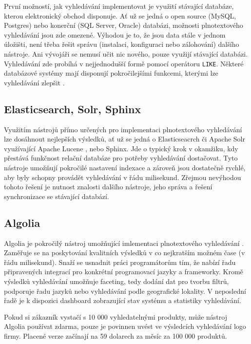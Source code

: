\documentclass[FM,DP]{tulthesis}
\begin{document}
První možností, jak vyhledávání implementovat je využití stávající databáze, 
kterou elektronický obchod disponuje. Ať už se jedná o open source (MySQL, Postgres)
nebo konerční (SQL Server, Oracle) databázi, možnosti plnotextového vyhledávání
jsou zde omezené. Výhodou je to, že jsou data stále v jednom úložišti, není třeba
řešit správu (instalaci, konfiguraci nebo zálohování) dalšího nástroje. Ani vývojáři 
se nemusí učit nic nového, pouze využijí stávající databázi. Vyhledávání zde probíhá
v nejjednodušší formě pomocí operátoru \verb|LIKE|. Některé databázové systémy
mají disponují pokročilejšími funkcemi, kterými lze vyhledávání zlepšit \cite{postgres}.

\subsection{Elasticsearch, Solr, Sphinx}

Využitím nástrojů přímo určených pro implementaci plnotextového vyhledávání lze 
dosáhnout nejlepších výsledků, ať už se jedná o Elasticseacrch či Apache Solr využívající
Apache Lucene \cite{lucene}, nebo Sphinx. Jde o typický krok v okamžiku, kdy
přestává funkčnost relační databáze pro potřeby vyhledávání dostačovat. Tyto nástroje
umožňují pokročilé nastavení indexace a zároveň jsou dostatečně rychlé, aby byly
schopny provádět vyhledávání v řádu milisekund. Zřejmou nevýhodou tohoto řešení
je nutnost znalosti dalšího nástroje, jeho správa a řešení synchronizace se 
stávající databází.

\subsection{Algolia}

Algolia je pokročilý nástroj umožňující imlementaci plnotextového vyhledávání \cite{algolia}. 
Zaměřuje se na poskytování kvalitních výsledků v co nejkratším možném čase (v řádu milisekund). 
Snaží se usnadnit práci programátorům tím, že nabízí řadu připravených integrací 
pro konkrétní programovací jazyky a frameworky. Kromě výsledků vyhledávání umožňuje 
faceting, tedy dodání dat pro tvorbu filtrů, podporuje řadu jazyků nebo vyhledávání 
podle geografické lokality. V neposlední řadě je k dispozici dashboard zobrazující 
stav systému a statistiky vyhledávání.

Pokud si zákazník vystačí s 10 000 vyhledatelnými produkty, může nástroj Algolia používat
zdarma, pouze je povinnen uvést ve výsledcích vyhledávání logo firmy. Placené verze 
začínají na 59 dolarech za měsíc za 100 000 produktů.
\end{document}
